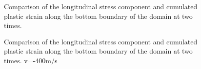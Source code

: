 \begin{figure}[ht]
  \centering
  {}
  {}
  
  \caption{Comparison of the longitudinal stress component and cumulated plastic strain along the bottom boundary of the domain at two times.}
  \label{fig:bottom_line}
\end{figure}

\begin{figure}[ht]
  \centering
  
  \caption{Comparison of the longitudinal stress component and cumulated plastic strain along the bottom boundary of the domain at two times. v=-400m/s}
\end{figure}


